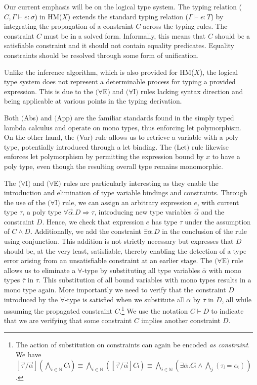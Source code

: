 \documentclass[runningheads]{llncs}
\newcommand{\hmx}{HM($X$)}
\begin{document}
Our current emphasis will be on the logical type system.
The typing relation ($C, Γ ⊢ e : σ$) in \hmx{} extends the standard
typing
relation ($Γ ⊢ e : T$) by integrating the propagation of a constraint $C$
across the typing rules. The constraint $C$ must be in a solved form.
Informally, this means that $C$ should be a satisfiable constraint and it
should not contain equality predicates. Equality constraints should be
resolved
through some form of unification.

Unlike the inference
algorithm, which is also provided for \hmx{}, the logical type system
does
not
represent a determinable process for typing a provided expression. This
is
due
to the $(∀$E$)$ and $(∀$I$)$ rules lacking syntax direction and being
applicable at various points in the typing derivation.

Both $($Abs$)$ and $($App$)$ are the familiar standards
found in the simply typed lambda
calculus and operate on mono types, thus enforcing let
polymorphism.
On the other hand, the $($Var$)$ rule allows us to
retrieve a variable with a poly type, potentially introduced through a
let
binding.
The $($Let$)$ rule likewise enforces let polymorphism by permitting the
expression bound by $x$ to have a poly type, even though the resulting
overall type
remains monomorphic.

The $(∀$I$)$ and $(∀$E$)$ rules are particularly interesting as they
enable
the
introduction and elimination of type variable bindings and constraints.
Through the use of the $(∀$I$)$ rule, we can assign an arbitrary
expression
$e$, with current type $τ$, a poly type $∀ \Vec α.D ⇒ τ$, introducing new
type
variables $\Vec α$ and the constraint $D$.
Hence, we check that expression $e$ has type $τ$ under the assumption of
$C ∧
  D$.
Additionally, we add the constraint $∃\bar{α}. D$ in the conclusion of
the
rule using conjunction.
This addition is not strictly necessary but expresses that $D$ should be,
at
the very least, satisfiable, thereby enabling the detection of a type
error
arising from an unsatisfiable constraint at an earlier stage.
The $(∀$E$)$ rule allows us to eliminate a $∀$-type by substituting all
type
variables $\bar{α}$ with mono types $\bar{τ}$ in $τ$. This substitution
of
all
bound variables with mono types results in a mono type again. More
importantly
we need to verify that the constraint $D$ introduced by the $∀$-type is
satisfied when we substitute all $\bar{α}$ by $\bar{τ}$ in $D$, all while
assuming the propagated constraint $C$.\footnote{
The action of substitution on constraints can again be encoded \emph{as
  constraint}.
We have $[\Vec τ / \Vec α] (⋀_{i ∈ ℕ} Cᵢ) ≡ ⋀_{i ∈ ℕ} ([\Vec τ / \Vec
      α]Cᵢ) ≡
  ⋀_{i ∈ ℕ} (∃\bar{α}. Cᵢ ∧ ⋀_{j}(τⱼ = αⱼ))$.

}
We use the notation $C ⊢ D$ to indicate that we are verifying that some
constraint $C$
implies another constraint
$D$.
\end{document}
